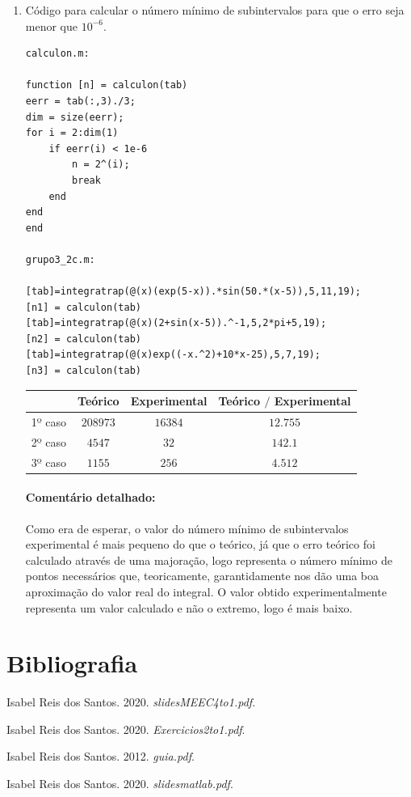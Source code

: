 \documentclass[a4paper,10pt]{extarticle}
\begin{document}
\begin{enumerate}
\begin{enumerate}
\item Código para calcular o número mínimo de subintervalos para que o erro seja menor que $10^{-6}$.

{\small
\begin{verbatim}
calculon.m:

function [n] = calculon(tab)
eerr = tab(:,3)./3;
dim = size(eerr);
for i = 2:dim(1)
    if eerr(i) < 1e-6
        n = 2^(i);
        break
    end
end
end

grupo3_2c.m:

[tab]=integratrap(@(x)(exp(5-x)).*sin(50.*(x-5)),5,11,19);
[n1] = calculon(tab)
[tab]=integratrap(@(x)(2+sin(x-5)).^-1,5,2*pi+5,19);
[n2] = calculon(tab)
[tab]=integratrap(@(x)exp((-x.^2)+10*x-25),5,7,19);
[n3] = calculon(tab)

\end{verbatim}
}

{\small 
\begin{center}
\begin{tabular}{|c|c|c|c|}
\hline
& Teórico&Experimental& Teórico $/$ Experimental\\
\hline
1º caso & $208973$&$16384$& $12.755$\\
\hline
2º caso & $4547$&$32$& $142.1$\\
\hline
3º caso & $1155$&$256$& $4.512$\\
\hline
\end{tabular}
\end{center}
}

\paragraph{Comentário detalhado:}

Como era de esperar, o valor do número mínimo de subintervalos experimental é mais pequeno do que o teórico, já que o erro teórico foi calculado através de uma majoração, logo representa o número mínimo de pontos necessários que, teoricamente, garantidamente nos dão uma boa aproximação do valor real do integral. O valor obtido experimentalmente representa um valor calculado e não o extremo, logo é mais baixo.

\end{enumerate}
\end{enumerate}
\section*{Bibliografia}

\begin{description}
\item Isabel Reis dos Santos. 2020. {\it slidesMEEC4to1.pdf}.
\item Isabel Reis dos Santos. 2020. {\it Exercicios2to1.pdf}.
\item Isabel Reis dos Santos. 2012. {\it guia.pdf}.
\item Isabel Reis dos Santos. 2020. {\it slidesmatlab.pdf}.

\end{description}
\end{document}
